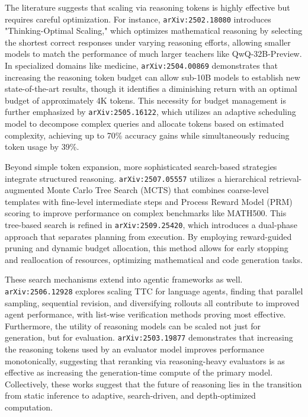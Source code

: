\documentclass[11pt]{article}
\begin{document}
The literature suggests that scaling via reasoning tokens is highly effective but requires careful optimization. For instance, \texttt{arXiv:2502.18080} introduces "Thinking-Optimal Scaling," which optimizes mathematical reasoning by selecting the shortest correct responses under varying reasoning efforts, allowing smaller models to match the performance of much larger teachers like QwQ-32B-Preview. In specialized domains like medicine, \texttt{arXiv:2504.00869} demonstrates that increasing the reasoning token budget can allow sub-10B models to establish new state-of-the-art results, though it identifies a diminishing return with an optimal budget of approximately 4K tokens. This necessity for budget management is further emphasized by \texttt{arXiv:2505.16122}, which utilizes an adaptive scheduling model to decompose complex queries and allocate tokens based on estimated complexity, achieving up to 70\% accuracy gains while simultaneously reducing token usage by 39\%.

Beyond simple token expansion, more sophisticated search-based strategies integrate structured reasoning. \texttt{arXiv:2507.05557} utilizes a hierarchical retrieval-augmented Monte Carlo Tree Search (MCTS) that combines coarse-level templates with fine-level intermediate steps and Process Reward Model (PRM) scoring to improve performance on complex benchmarks like MATH500. This tree-based search is refined in \texttt{arXiv:2509.25420}, which introduces a dual-phase approach that separates planning from execution. By employing reward-guided pruning and dynamic budget allocation, this method allows for early stopping and reallocation of resources, optimizing mathematical and code generation tasks.

These search mechanisms extend into agentic frameworks as well. \texttt{arXiv:2506.12928} explores scaling TTC for language agents, finding that parallel sampling, sequential revision, and diversifying rollouts all contribute to improved agent performance, with list-wise verification methods proving most effective. Furthermore, the utility of reasoning models can be scaled not just for generation, but for evaluation. \texttt{arXiv:2503.19877} demonstrates that increasing the reasoning tokens used by an evaluator model improves performance monotonically, suggesting that reranking via reasoning-heavy evaluators is as effective as increasing the generation-time compute of the primary model. Collectively, these works suggest that the future of reasoning lies in the transition from static inference to adaptive, search-driven, and depth-optimized computation.
\end{document}
